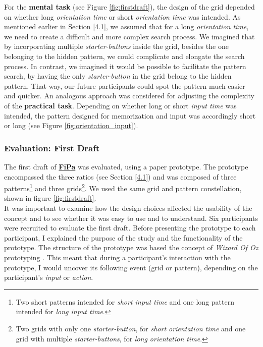 For the \textbf{mental task} (see Figure \ref{fig:firstdraft}), the design of the grid depended on whether long \textit{orientation time} or short \textit{orientation time} was intended. As mentioned earlier in Section \ref{4.1}, we assumed that for a long \textit{orientation time}, we need to create a difficult and more complex search process. We imagined that by incorporating multiple \textit{starter-buttons} inside the grid, besides the one belonging to the hidden pattern, we could complicate and elongate the search process. In contrast, we imagined it would be possible to facilitate the pattern search, by having the only \textit{starter-button} in the grid belong to the hidden pattern. That way, our future participants could spot the pattern much easier and quicker. An analogous approach was considered for adjusting the complexity of the \textbf{practical task}. Depending on whether long or short \textit{input time} was intended, the pattern designed for memorization and input was accordingly short or long (see Figure \ref{fig:orientation_input}).

\subsubsection{Evaluation: First Draft} \label{4.2.2.2}

The first draft of \underline{\textbf{FiPa}} was evaluated, using a paper prototype. The prototype encompassed the three ratios (see Section \ref{4.1}) and was composed of three patterns\footnote{Two short patterns intended for \textit{short input time} and one long pattern intended for \textit{long input time}.} and three grids\footnote{Two grids with only one \textit{starter-button}, for \textit{short orientation time} and one grid with multiple \textit{starter-buttons}, for \textit{long orientation time}.}. We used the same grid and pattern constellation, shown in figure \ref{fig:firstdraft}.\\
It was important to examine how the design choices affected the usability of the concept and to see whether it was easy to use and to understand. Six participants were recruited to evaluate the first draft. Before presenting the prototype to each participant, I explained the purpose of the study and the functionality of the prototype. The structure of the prototype was based the concept of \textit{Wizard Of Oz} prototyping \cite{Butz2014}. This meant that during a participant's interaction with the prototype, I would uncover its  following event (grid or pattern), depending on the participant's \textit{input} or \textit{action}.\\

